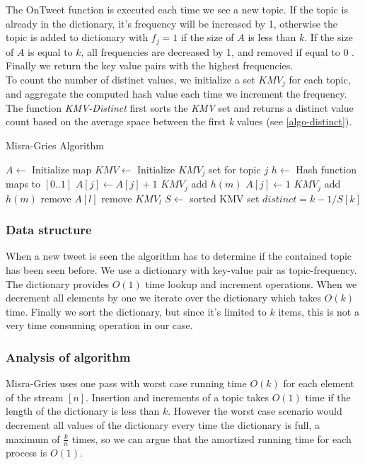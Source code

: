 The OnTweet function is executed each time we see a new topic. If the topic is already in the dictionary, it's frequency will be increased by 1, otherwise the topic is added to dictionary with $f_{j}=1$ if the size of $A$ is less than $k$. If the size of $A$ is equal to $k$, all frequencies are decreased by 1, and removed if equal to 0 \cite{Amit}. Finally we return the key value pairs with the highest frequencies.
\\
To count the number of distinct values, we initialize a set $KMV_{j}$ for each topic, and aggregate the computed hash value each time we increment the frequency. The function \textit{KMV-Distinct} first sorts the \textit{KMV} set and returns a distinct value count based on the average space between the first \textit{k} values (see \ref{algo-distinct}).
\\ 
\begin{algorithm}
\caption{Misra-Gries Algorithm}\label{misra-pseudo}
\begin{algorithmic}[1]
\State $A\gets$ Initialize map
\State $KMV\gets$ Initialize $KMV_{j}$ set for topic $j$
\State $h\gets$ Hash function maps to $[0..1]$
\Statex
{}
    \State $A[j] \leftarrow A[j] + 1$
    \State $KMV_{j}$ add $h(m)$
    \State $A[j] \leftarrow 1$
    \State $KMV_{j}$ add $h(m)$
\Else
        \State remove $A[l]$
        \State remove $KMV_{l}$
        \EndIf
    \EndFor
\EndIf
\EndFunction
\Statex
{}
\State $S\gets$ sorted KMV set
\State $distinct = k-1/S[k]$
\EndFunction
\end{algorithmic}
\end{algorithm}

\subsubsection{Data structure}
When a new tweet is seen the algorithm has to determine if the contained topic has been seen before. We use a dictionary with key-value pair as topic-frequency. The dictionary provides $O(1)$ time lookup and increment operations. When we decrement all elements by one we iterate over the dictionary which takes $O(k)$ time. Finally we sort the dictionary, but since it's limited to $k$ items, this is not a very time consuming operation in our case.

\subsubsection{Analysis of algorithm}\label{algo-analysis}
Misra-Gries uses one pass with worst case running time $O(k)$ for each element of the stream $[n]$. Insertion and increments of a topic takes $O(1)$ time if the length of the dictionary is less than $k$. However the worst case scenario would decrement all values of the dictionary every time the dictionary is full, a maximum of $\frac{k}{n}$ times, so we can argue that the amortized running time for each process is $O(1)$.


